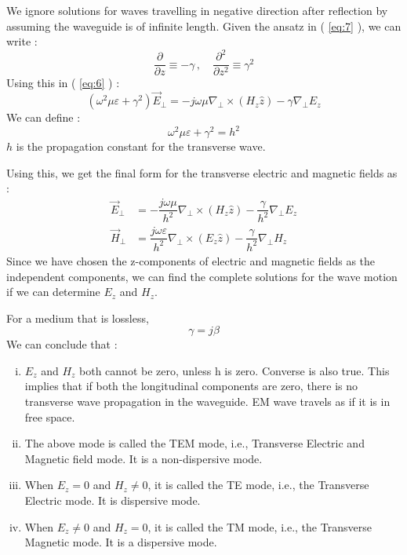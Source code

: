 \documentclass[12pt]{article}
\newcommand*{\myref}[1]{%
  \begingroup
    \hypersetup{
      linkcolor=linkequation,
      linkbordercolor=linkequation,
    }%
    \ref{#1}%
  \endgroup
}
\begin{document}
We ignore solutions for waves travelling in negative direction after reflection by assuming the waveguide is of infinite length. \linebreak
Given the ansatz in (\myref{eq:7}), we can write :
\begin{equation*}
  \dfrac{\partial}{\partial z} \equiv -\gamma \, , \quad \dfrac{\partial^2}{\partial z^2} \equiv \gamma^2
\end{equation*}
Using this in (\myref{eq:6}) :
\begin{equation*}
  \left( \omega^2 \mu \varepsilon+\gamma^2 \right) \vec{E}_{\perp} = -j\omega \mu \nabla_{\perp} \times \left( H_z \hat{z} \right)-\gamma \nabla_{\perp} E_z
\end{equation*}
We can define :
\begin{equation}
  \omega^2\mu \varepsilon+\gamma^2 = h^2 \label{eq:8}
\end{equation}
$h$ is the propagation constant for the transverse wave. \linebreak

Using this, we get the final form for the transverse electric and magnetic fields as :
\begin{align}
  \vec{E}_{\perp} &= -\dfrac{j \omega \mu}{h^2} \nabla_{\perp} \times \left( H_z \hat{z} \right) - \dfrac{\gamma}{h^2}\nabla_{\perp} E_z \label{eq:9}\\
  \vec{H}_{\perp} &= \dfrac{j\omega \varepsilon}{h^2}\nabla_{\perp} \times \left( E_z \hat{z} \right)-\dfrac{\gamma}{h^2} \nabla_{\perp} H_z \label{eq:10}
\end{align}
Since we have chosen the z-components of electric and magnetic fields as the independent components, we can find the complete solutions for the wave motion if we can determine $E_z$ and $H_z$. \linebreak

For a medium that is lossless, 
\begin{equation}
  \gamma = j \beta \label{eq:11}
\end{equation}
We can conclude that :
\begin{enumerate}[i.)]
  \item $E_z$ and $H_z$ both cannot be zero, unless h is zero. Converse is also true. This implies that if both the longitudinal components are zero, there is no transverse wave propagation in the waveguide. EM wave travels as if it is in free space. 
  \item The above mode is called the TEM mode, i.e., Transverse Electric and Magnetic field mode. It is a non-dispersive mode.
  \item When $E_z=0$ and $H_z \neq 0$, it is called the TE mode, i.e., the Transverse Electric mode. It is dispersive mode. 
  \item When $E_z \neq 0$ and $H_z=0$, it is called the TM mode, i.e., the Transverse Magnetic mode. It is a dispersive mode.
\end{enumerate}
\end{document}
